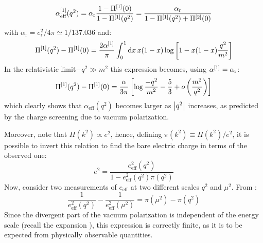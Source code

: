 \begin{equation*}
  \alpha_\text{eff}^{[1]}(q^2) = \alpha_\text{r} \frac{1 - \Pi^{[1]}(0)}{1 - \Pi^{[1]}(q^2)} = \frac{\alpha_\text{r}}{1 - \Pi^{[1]}(q^2) + \Pi^{[2]}(0)}
\end{equation*}
with $ \alpha_\text{r} = e_\text{r}^2 / 4\pi \simeq 1/137.036 $ and:
\begin{equation*}
  \Pi^{[1]}(q^2) - \Pi^{[1]}(0) = \frac{2\alpha^{[1]}}{\pi} \int_0^1 \mathrm{d} x \, x (1 - x) \log \left[ 1 - x (1 - x) \frac{q^2}{m^2} \right]
\end{equation*}
In the relativistic limit\footnotemark $ -q^2 \gg m^2 $ this expression becomes, using $ \alpha^{[1]} = \alpha_\text{r} $:
\begin{equation*}
  \Pi^{[1]}(q^2) - \Pi^{[1]}(0) = \frac{\alpha}{3\pi} \left[ \log \frac{- q^2}{m^2} - \frac{5}{3} + o \left( \frac{m^2}{q^2} \right) \right]
\end{equation*}
which clearly shows that $ \alpha_\text{eff}(q^2) $ becomes larger as $ \left\lvert q^2\right\rvert $ increases, as predicted by the charge screening due to vacuum polarization.


Moreover, note that $ \Pi(k^2) \propto e^2 $, hence, defining $ \pi(k^2) \equiv \Pi(k^2) / e^2 $, it is possible to invert this relation to find the bare electric charge in terms of the observed one:
\begin{equation}
  e^2 = \frac{e_\text{eff}^2(q^2)}{1 - e_\text{eff}^2(q^2) \pi(q^2)}
\end{equation}
Now, consider two measurements of $ e_\text{eff} $ at two different scales $ q^2 $ and $ \mu^2 $. From :
\begin{equation*}
  \frac{1}{e_\text{eff}^2(q^2)} - \frac{1}{e_\text{eff}^2(\mu^2)} = \pi(\mu^2) - \pi(q^2)
\end{equation*}
Since the divergent part of the vacuum polarization is independent of the energy scale (recall the expansion ), this expression is correctly finite, as it is to be expected from physically observable quantities.

